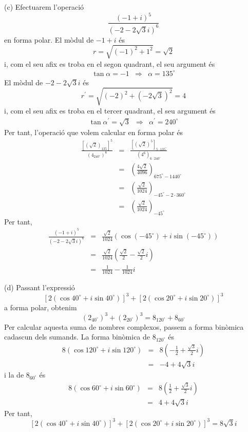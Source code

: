 \begin{solucio}
(c) Efectuarem l’operació
\[
\frac{(-1+i)^{5}}{(-2-2\sqrt{3}i)^{6}}
\]
en forma polar. El mòdul de $-1+i$ és
\[
r=\sqrt{(-1)^{2}+1^{2}}=\sqrt{2}
\]
i, com el seu afix es troba en el segon quadrant, el seu argument és
\[
\begin{array}{lll}
\tan \alpha =-1 & \Longrightarrow & \alpha =135
^{\circ}
\end{array}
\]
El mòdul de $-2-2\sqrt{3}i$ és
\[
r^{\prime }=\sqrt{(-2)^{2}+\left( -2\sqrt{3}\right) ^{2}}=4
\]
i, com el seu afix es troba en el tercer quadrant, el seu argument és
\[
\begin{array}{lll}
\tan \alpha ^{\prime }=\sqrt{3} & \Longrightarrow & \alpha ^{\prime }=240
^{\circ}
\end{array}
\]
Per tant, l’operació que volem calcular en forma polar és
\begin{eqnarray*}
\frac{\left[ \left( \sqrt{2}\right) _{135}\right] ^{5}}{\left( 4_{240
^{\circ}
}\right) ^{6}} &=&\frac{\left[ \left( \sqrt{2}\right) ^{5}\right] _{5\cdot
135
^{\circ}
}}{\left( 4^{6}\right) _{6\cdot 240
^{\circ}
}} \\
&=&\left( \frac{4\sqrt{2}}{4096}\right) _{675
^{\circ}
-1440
^{\circ}
} \\
&=&\left( \frac{\sqrt{2}}{1024}\right) _{-45
^{\circ}
-2\cdot 360
^{\circ}
} \\
&=&\left( \frac{\sqrt{2}}{1024}\right) _{-45
^{\circ}
}
\end{eqnarray*}
Per tant,
\begin{eqnarray*}
\frac{(-1+i)^{5}}{(-2-2\sqrt{3}i)^{6}} &=&\frac{\sqrt{2}}{1024}(\cos (-45
^{\circ}
)+i\sin (-45
^{\circ}
)) \\
&=&\frac{\sqrt{2}}{1024}\left( \frac{\sqrt{2}}{2}-\frac{\sqrt{2}}{2}i\right)
\\
&=&\frac{1}{1024}-\frac{1}{1024}i
\end{eqnarray*}

(d) Passant l’expressió
\[
\left[ 2(\cos 40
^{\circ}
+i\sin 40
^{\circ}
)\right] ^{3}+\left[ 2(\cos 20
^{\circ}
+i\sin 20
^{\circ}
)\right] ^{3}
\]
a forma polar, obtenim
\[
\left( 2_{40
^{\circ}
}\right) ^{3}+\left( 2_{20
^{\circ}
}\right) ^{3}=8_{120
^{\circ}
}+8_{60
^{\circ}
}
\]
Per calcular aquesta suma de nombres complexos, passem a forma binòmica cadascun dels sumands. La forma binòmica de $8_{120
^{\circ}
}$ és
\begin{eqnarray*}
8(\cos 120
^{\circ}
+i\sin 120
^{\circ}
) &=&8\left( -\frac{1}{2}+\frac{\sqrt{3}}{2}i\right) \\
&=&-4+4\sqrt{3}i
\end{eqnarray*}
i la de $8_{60
^{\circ}
}$ és
\begin{eqnarray*}
8(\cos 60
^{\circ}
+i\sin 60
^{\circ}
) &=&8\left( \frac{1}{2}+\frac{\sqrt{3}}{2}i\right) \\
&=&4+4\sqrt{3}i
\end{eqnarray*}
Per tant,
\[
\left[ 2(\cos 40
^{\circ}
+i\sin 40
^{\circ}
)\right] ^{3}+\left[ 2(\cos 20
^{\circ}
+i\sin 20
^{\circ}
)\right] ^{3}=8\sqrt{3}i
\]
\end{solucio}

